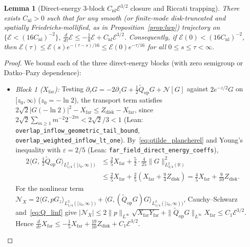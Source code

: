 \documentclass[11pt,a4paper]{article}
\newtheorem{lem}{Lemma}[section]
\begin{document}
\begin{lem}[Direct-energy 3-block $C_{\mathrm{nl}}\mathcal{E}^{3/2}$ closure and Riccati trapping]\label{lem:three_block_nl}
There exists $C_{\mathrm{nl}}>0$ such that for any smooth (or finite-mode disk-truncated and spatially Friedrichs-mollified, as in Proposition~\ref{prop:lwp}) trajectory on $\{\mathcal{E}<(16 C_{\mathrm{nl}})^{-2}\}$,
$\frac{d}{d\tau}\mathcal{E}\le -\frac{1}{8}\mathcal{E} + C_{\mathrm{nl}}\mathcal{E}^{3/2}$.
Consequently, if $\mathcal{E}(0)<(16 C_{\mathrm{nl}})^{-2}$, then $\mathcal{E}(\tau)\le\mathcal{E}(s)e^{-(\tau-s)/16}\le\mathcal{E}(0)e^{-\tau/16}$ for all $0\le s\le\tau<\infty$.
\end{lem}
\begin{proof}
We bound each of the three direct-energy blocks (with zero semigroup or Datko--Pazy dependence):
\begin{itemize}\setlength\itemsep{2pt}
\item \emph{Block 1 ($X_{\mathrm{far}}$):}
  Testing $\partial_\tau G = -2\partial_z G + \tfrac12\widetilde{Q}_{\mathrm{op}}G + \mathcal{N}[G]$
  against $2e^{-z/2}G$ on $[z_0,\infty)$ ($z_0=-\ln 2$), the transport term satisfies
  $2\sqrt{2}|G(-\ln 2)|^2 - X_{\mathrm{far}} \le Z_{\mathrm{disk}} - X_{\mathrm{far}}$,
  since $2\sqrt{2}\sum_{m\ge 1} m^{-2}2^{-2m} < 2\sqrt{2}/3 < 1$
  (Lean: \texttt{overlap\_inflow\_geometric\_tail\_bound},\\
  \texttt{overlap\_weighted\_inflow\_lt\_one}).
  By~\eqref{eq:qtilde_plancherel} and Young's inequality with $\varepsilon=2/5$
  (Lean: \texttt{far\_field\_direct\_energy\_coeffs}),
  \begin{align*}
  2\bigl\langle G,\,\tfrac12\widetilde{Q}_{\mathrm{op}}G\bigr\rangle_{L^2_{1/4}([z_0,\infty))}
  &\le \frac{2}{5}X_{\mathrm{far}} + \frac{5}{2}\cdot\frac{4}{25}\|G\|_{L^2_{3/4}(\mathbb{R})}^2 \\
  &\le \frac{2}{5}X_{\mathrm{far}} + \frac{2}{5}\left(X_{\mathrm{far}}+\frac{9}{4}Z_{\mathrm{disk}}\right)
  = \frac{4}{5}X_{\mathrm{far}} + \frac{9}{10}Z_{\mathrm{disk}}.
  \end{align*}
  For the nonlinear term
  $\mathcal{N}_X = 2\langle G, p G_z\rangle_{L^2_{1/4}([z_0,\infty))} + \langle G, (\widetilde{Q}_{\mathrm{op}}G)G\rangle_{L^2_{1/4}([z_0,\infty))}$,
  Cauchy--Schwarz and~\eqref{eq:Q_linf} give
  $|\mathcal{N}_X|\le 2\|p\|_{L^\infty}\sqrt{X_{\mathrm{far}}Y_{\mathrm{far}}} + \|\widetilde{Q}_{\mathrm{op}}G\|_{L^\infty}X_{\mathrm{far}}\le C_1\mathcal{E}^{3/2}$.
  Hence $\frac{d}{d\tau}X_{\mathrm{far}}\le -\frac{1}{5}X_{\mathrm{far}} + \frac{19}{10}Z_{\mathrm{disk}} + C_1\mathcal{E}^{3/2}$.

\end{itemize}
\end{proof}
\end{document}
